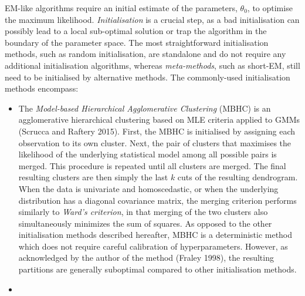 EM-like algorithms require an initial estimate of the parameters, \(\theta_0\), to
optimise the maximum likelihood. \emph{Initialisation} is a crucial step, as
a bad initialisation can possibly lead to a local sub-optimal solution
or trap the algorithm in the boundary of the parameter space. The most straightforward initialisation methods, such as random initialisation, are standalone and do not require any additional initialisation algorithms, whereas \emph{meta-methods}, such as short-EM, still need to be initialised by alternative methods. The commonly-used initialisation methods encompass:

\begin{itemize}
\item
  The \emph{Model-based Hierarchical Agglomerative Clustering} (MBHC) is
  an agglomerative hierarchical clustering based on MLE criteria applied to
  GMMs (Scrucca and Raftery 2015). First, the MBHC is
  initialised by assigning each observation to its own cluster. Next,
  the pair of clusters that maximises the likelihood of the underlying
  statistical model among all possible pairs is merged. This procedure
  is repeated until all clusters are merged. The final resulting
  clusters are then simply the last \(k\) cuts of the resulting
  dendrogram. When the data is univariate and homoscedastic, or when the underlying distribution has a diagonal covariance matrix, the merging criterion performs similarly to \emph{Ward's criterion}, in that merging of the two clusters also simultaneously minimizes the sum of squares.
  As opposed to the other initialisation methods described hereafter, MBHC is a
  deterministic method which does not require careful calibration of
  hyperparameters. However, as acknowledged by the author of the method (Fraley 1998), the resulting partitions are generally suboptimal compared to other initialisation methods.
\item

\end{itemize}
